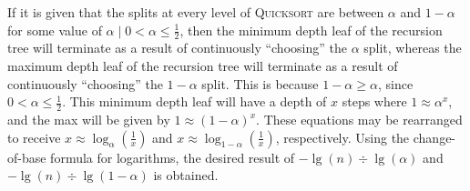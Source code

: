 If it is given that the splits at every level of \textsc{Quicksort} are between $ \alpha $ and $ 1 - \alpha $ for some value of $ \alpha \mid 0 < \alpha \leq \frac{1}{2} $, then the minimum depth leaf of the recursion tree will terminate as a result of continuously ``choosing'' the $ \alpha $ split, whereas the maximum depth leaf of the recursion tree will terminate as a result of continuously ``choosing'' the $ 1 - \alpha $ split. This is because $ 1 - \alpha \geq \alpha $, since $ 0 < \alpha \leq \frac{1}{2} $. This minimum depth leaf will have a depth of $ x $ steps where $ 1 \approx \alpha^x $, and the max will be given by $ 1 \approx (1 - \alpha)^x $. These equations may be rearranged to receive $ x \approx \log_{\alpha}(\frac{1}{x}) $ and $ x \approx \log_{1 - \alpha}(\frac{1}{x}) $, respectively. Using the change-of-base formula for logarithms, the desired result of $ -\lg(n) \div \lg(\alpha) $ and $ -\lg(n) \div \lg(1 - \alpha) $ is obtained.